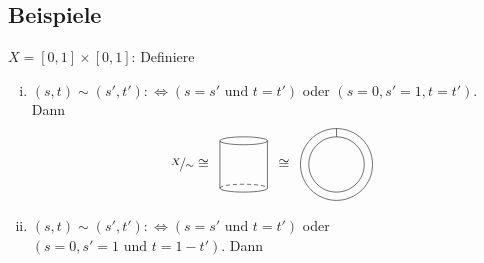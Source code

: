 \subsection[Beispiele zur Quotiententopologie]{Beispiele}
\label{sub:210}
$X = [0,1] \times [0,1]$: Definiere 
\begin{enumerate}[(i)]
	\item $(s,t) \sim (s', t') :\Leftrightarrow (s=s' \text{ und } t=t')$ oder $(s=0, s'=1, t=t')$. Dann 
	\[
		\nicefrac{X}{\sim} \cong \enspace
		\vcenter{\hbox{\begin{tikzpicture}[yscale=0.2,xscale=0.3]
		\draw (-2,6) -- (-2,0) arc (180:360:2cm and 0.5cm) -- (2,6) ++ (-2,0) circle (2cm and 0.5cm);
		\draw[densely dashed] (-2,0) arc (180:0:2cm and 0.5cm);
		\end{tikzpicture}}} \enspace
		 \cong \enspace \vcenter{\hbox{\begin{tikzpicture}[scale=0.7]
		 	\draw (0,0) circle[radius=1];
			\draw (0,0) circle[radius=1.3];
			\draw (0,1) -- (0,1.3);
		 \end{tikzpicture}}}
	\]
	\item $(s,t) \sim (s',t') :\Leftrightarrow (s=s' \text{ und }t=t')$ oder $(s=0, s'=1 \text{ und } t=1-t')$. Dann \\
	\begin{minipage}{\textwidth}
		\captionsetup{type=figure, skip=0pt}
\end{minipage}
\end{enumerate}
